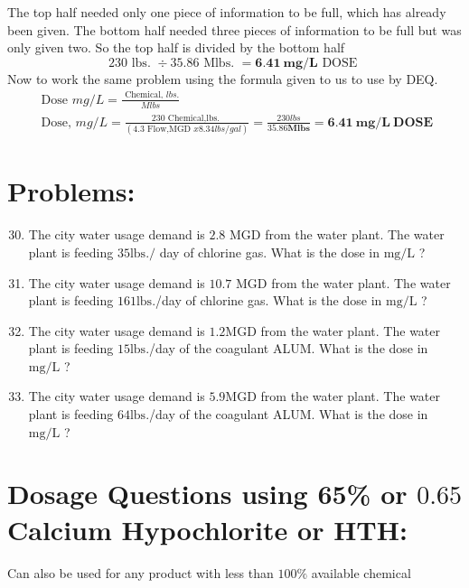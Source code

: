 \documentclass[10pt]{article}
\begin{document}
The top half needed only one piece of information to be full, which has already been given. The bottom half needed three pieces of information to be full but was only given two. So the top half is divided by the bottom half
$$
230 \text { lbs. } \div 35.86 \text { Mlbs. }=\mathbf{6 . 4 1} \mathbf{~ m g} / \mathbf{L} \text { DOSE }
$$
Now to work the same problem using the formula given to us to use by DEQ.
$$
\begin{gathered}
\text { Dose } m g / L=\frac{\text { Chemical, } l b s .}{M l b s} \\
\text { Dose, } m g / L=\frac{230 \text { Chemical,lbs. }}{(4.3 \text { Flow,MGD } x 8.34 l b s / g a l)}=\frac{230 l b s}{35.86 \mathbf{M l b s}}=\mathbf{6 . 4 1} \mathbf{~ m g} / \mathbf{L ~ D O S E}
\end{gathered}
$$

\section{Problems:}
\begin{enumerate}
  \setcounter{enumi}{29}
  \item The city water usage demand is $2.8$ MGD from the water plant. The water plant is feeding $35 \mathrm{lbs} . /$ day of chlorine gas. What is the dose in $\mathrm{mg} / \mathrm{L}$ ?

  \item The city water usage demand is $10.7$ MGD from the water plant. The water plant is feeding $161 \mathrm{lbs}$./day of chlorine gas. What is the dose in $\mathrm{mg} / \mathrm{L}$ ?

  \item The city water usage demand is $1.2 \mathrm{MGD}$ from the water plant. The water plant is feeding $15 \mathrm{lbs}$./day of the coagulant ALUM. What is the dose in $\mathrm{mg} / \mathrm{L}$ ?

  \item The city water usage demand is $5.9 \mathrm{MGD}$ from the water plant. The water plant is feeding $64 \mathrm{lbs}$./day of the coagulant ALUM. What is the dose in $\mathrm{mg} / \mathrm{L}$ ?

\end{enumerate}
\section{Dosage Questions using 65\% or $0.65$ Calcium Hypochlorite or HTH:}
Can also be used for any product with less than $100 \%$ available chemical
\end{document}
